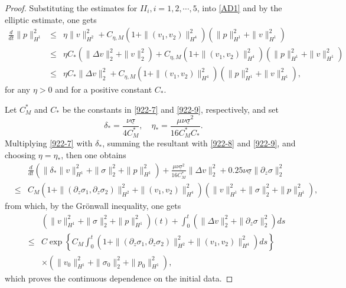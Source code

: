 \documentclass[12pt,reqno]{amsart}
\numberwithin{equation}{section}
\begin{document}
\begin{proof}
  Substituting the estimates for $II_i, i=1,2,\cdots,5$, into \eqref{AD1} and by the elliptic estimate, one gets
    \begin{eqnarray}
    \frac{d}{dt}\|p\|_{H^1}^2
    &\leq&\eta\|v\|_{H^2}^2+C_{\eta,M}\left(1+\|(v_1,v_2)\|_{H^4}^2\right)(\|p\|_{H^1}^2+\|v\|_{H^1}^2)\nonumber\\
    &\leq&\eta C_*(\|\Delta v\|_2^2+\|v\|_2^2)+C_{\eta,M}\left(1+\|(v_1,v_2)\|_{H^4}^2\right)(\|p\|_{H^1}^2+\|v\|_{H^1}^2)\nonumber\\
    &\leq&\eta C_*\|\Delta v\|_2^2+C_{\eta,M}\left(1+\|(v_1,v_2)\|_{H^4}^2\right)(\|p\|_{H^1}^2+\|v\|_{H^1}^2),\label{922-9}
  \end{eqnarray}
  for any $\eta>0$ and for a positive constant $C_*$.

  Let $C_M^*$ and $C_*$ be the constants in \eqref{922-7} and \eqref{922-9}, respectively, and set
  $$
  \delta_*=\frac{\nu\underline\sigma}{4 C_M^*},\quad \eta_*=\frac{\mu\nu\underline\sigma^2}{16C_M^*C_*}.
  $$
  Multiplying \eqref{922-7} with $\delta_*$, summing the resultant with \eqref{922-8} and \eqref{922-9}, and choosing $\eta=\eta_*$, then one obtains
  \begin{eqnarray*}
    &&\frac{d}{dt}(\|\delta_*\|v\|_{H^1}^2+\|\sigma\|_2^2+\|p\|_{H^1}^2)+\frac{\mu\nu\underline\sigma^2}{16C_M^*}\|\Delta v\|_2^2
    +0.25\nu\underline\sigma\|\partial_z\sigma\|_2^2\\
    &\leq& C_M(1+\|(\partial_z\sigma_1,\partial_z\sigma_2)\|_{H^2}^2+\|(v_1,v_2)\|_{H^4}^2)(\|v\|_{H^1}^2+\|\sigma\|_2^2+\|p\|_{H^1}^2),
  \end{eqnarray*}
  from which, by the Gr\"onwall inequality, one gets
  \begin{eqnarray*}
    &&\left(\|v\|_{H^1}^2+\|\sigma\|_2^2+\|p\|_{H^1}^2\right)(t)+\int_0^t(\|\Delta v\|_2^2+\|\partial_z\sigma\|_2^2)ds\\
    &\leq& C\exp\left\{C_M\int_0^t(1+\|(\partial_z\sigma_1,\partial_z\sigma_2)\|_{H^2}^2+\|(v_1,v_2)\|_{H^4}^2)ds\right\}\\
    &&\times(\|v_0\|_{H^1}^2
    +\|\sigma_0\|_2^2+\|p_0\|_{H^1}^2),
  \end{eqnarray*}
  which proves the continuous dependence on the initial data.
\end{proof}
\end{document}
